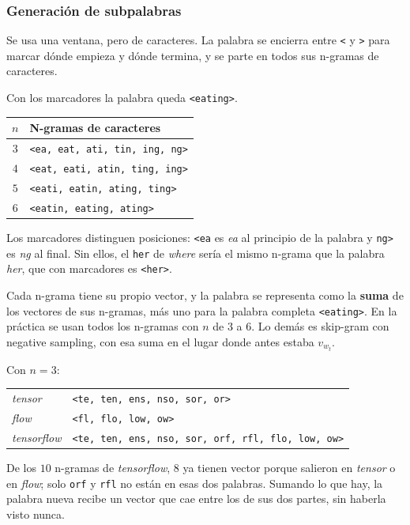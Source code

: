 \documentclass[11pt,letterpaper]{article}
\begin{document}
\subsubsection*{Generación de subpalabras}

Se usa una ventana, pero de caracteres. La palabra se encierra entre
\texttt{<} y \texttt{>} para marcar dónde empieza y dónde termina, y
se parte en todos sus n-gramas de caracteres.

\begin{ejemplo}
    Con los marcadores la palabra queda \texttt{<eating>}.
    \begin{center}
    \begin{tabular}{cl}
        \toprule
        $n$ & \textbf{N-gramas de caracteres} \\
        \midrule
        $3$ & \texttt{<ea, eat, ati, tin, ing, ng>} \\
        $4$ & \texttt{<eat, eati, atin, ting, ing>} \\
        $5$ & \texttt{<eati, eatin, ating, ting>} \\
        $6$ & \texttt{<eatin, eating, ating>} \\
        \bottomrule
    \end{tabular}
    \end{center}
    Los marcadores distinguen posiciones: \texttt{<ea} es \textit{ea}
    al principio de la palabra y \texttt{ng>} es \textit{ng} al final.
    Sin ellos, el \texttt{her} de \textit{where} sería el mismo
    n-grama que la palabra \textit{her}, que con marcadores es
    \texttt{<her>}.
\end{ejemplo}

Cada n-grama tiene su propio vector, y la palabra se representa como
la \textbf{suma} de los vectores de sus n-gramas, más uno para la
palabra completa \texttt{<eating>}. En la práctica se usan todos los
n-gramas con $n$ de $3$ a $6$. Lo demás es skip-gram con negative
sampling, con esa suma en el lugar donde antes estaba $v_{w_t}$.

\begin{ejemplo}
    Con $n = 3$:
    \begin{center}
    \small
    \begin{tabular}{ll}
        \toprule
        \textit{tensor}     & \texttt{<te, ten, ens, nso, sor, or>} \\
        \textit{flow}       & \texttt{<fl, flo, low, ow>} \\
        \textit{tensorflow} & \texttt{<te, ten, ens, nso, sor, orf,
                                      rfl, flo, low, ow>} \\
        \bottomrule
    \end{tabular}
    \end{center}
    De los $10$ n-gramas de \textit{tensorflow}, $8$ ya tienen vector
    porque salieron en \textit{tensor} o en \textit{flow}; solo
    \texttt{orf} y \texttt{rfl} no están en esas dos palabras. Sumando
    lo que hay, la palabra nueva recibe un vector que cae entre los de
    sus dos partes, sin haberla visto nunca.
\end{ejemplo}
\end{document}
